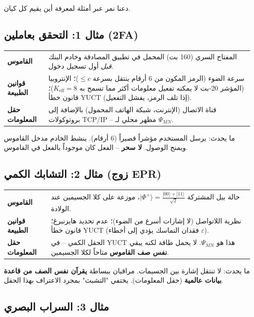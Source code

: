 \documentclass[11pt,a4paper]{article}
\begin{document}
	دعنا نمر عبر أمثلة لمعرفة أين يقيم كل كيان.
	
	\subsection{مثال 1: التحقق بعاملين (2FA)}
	
	\begin{tabular}{p{2.8cm} p{10cm}}
		\textbf{القاموس} & المفتاح السري (160 بت) المحمل في تطبيق المصادقة وخادم البنك \emph{قبل} أول تسجيل دخول. \\
		\textbf{قوانين الطبيعة} & سرعة الضوء (الرمز المكون من 6 أرقام ينتقل بسرعة \(\le c\))؛ الإنتروبيا (المؤشر 20‑بت لا يمكنه تفعيل معلومات أكثر مما تسمح به \(K_{\mathrm{eff}}=8\))؛ قانون خطأ YUCT (إذا تلف الرمز، يفشل التفعيل). \\
		\textbf{حقل المعلومات} & قناة الاتصال (الإنترنت، شبكة الهاتف المحمول) بالإضافة إلى بروتوكولات TCP/IP -- مظهر محلي لـ \(\Psi_{MN}\). \\
	\end{tabular}
	
	\noindent ما يحدث: يرسل المستخدم مؤشراً قصيراً (6 أرقام). ينشط الخادم مدخل القاموس ويمنح الوصول. \textbf{لا سحر} -- الفعل كان موجوداً بالفعل في القاموس.
	
	\subsection{مثال 2: التشابك الكمي (زوج EPR)}
	
	\begin{tabular}{p{2.8cm} p{10cm}}
		\textbf{القاموس} & حالة بيل المشتركة \(|\Phi^+\rangle = \frac{|00\rangle + |11\rangle}{\sqrt{2}}\)، موزعة على كلا الجسيمين عند الولادة. \\
		\textbf{قوانين الطبيعة} & نظرية اللاتواصل (لا إشارات أسرع من الضوء)؛ عدم تحديد هايزنبرغ؛ قانون خطأ YUCT (فقدان التماسك يؤدي إلى أخطاء \(\varepsilon\)). \\
		\textbf{حقل المعلومات} & الحقل الكمي -- في YUCT هذا هو \(\Psi_{MN}\). لا يحمل طاقة لكنه يبقي \textbf{نفس صف القاموس} متاحاً لكلا الجسيمين. \\
	\end{tabular}
	
	\noindent ما يحدث: لا تنتقل إشارة بين الجسيمات. مراقبان ببساطة \textbf{يقرآن نفس الصف من قاعدة بيانات عالمية} (حقل المعلومات). يختفي "التشبث" بمجرد الاعتراف بهذا الحقل.
	
	\subsection{مثال 3: السراب البصري}
	
\end{document}
